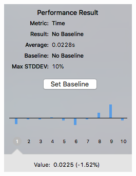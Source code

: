 \begin{figure}[h]
\begin{minipage}{.5\textwidth}
  \includegraphics[width=.8\linewidth]{inc/img/perf/testRSADecryptPerformance.png}
  \label{sec:eng:performance:rsaenc:dec}
\end{minipage}
\end{figure}